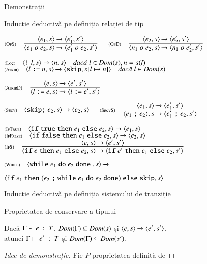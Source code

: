 \documentclass[xcolor=pdftex,romanian,colorlinks,handout]{beamer}
\begin{document}
\begin{section}{Demonstrații}
\begin{subsection}{Inducție deductivă pe definiția relației de tip}
\begin{frame}
\vfill { $\reg[OpS]{\Ss{\c{e_1 \mathrel{o} e_2,\stare}}{\c{e_1' \mathrel{o} e_2,\stare'}}}{\Ss{\c{e_1,\stare}}{\c{e_1',\stare'}}}{}$\hfill
$\reg[OpD]{\Ss{\c{n_1 \mathrel{o} e_2,\stare}}{\c{n_1 \mathrel{o} e_2',\stare'}}}{\Ss{\c{e_2,\stare}}{\c{e_2',\stare'}}}{}$}

\vfill $\reg[Loc]{\Ss{\c{\terminal{!} l,\stare}}{\c{n, \stare}}}{}{l\in\Dom(\stare), n = \stare(l)}$
$\reg[Atrib]{\Ss{\c{l \terminal{:=} n,\stare}}{\c{\terminal{skip},\stare[l \mapsto n]}}}{}{l\in\Dom(\stare)}$

\vfill$\reg[AtribD]{\Ss{\c{l \terminal{:=} e ,\stare}}{\c{l \terminal{:=} e' ,\stare'}}}{\Ss{\c{e,\stare}}{\c{e',\stare'}}}{}$

$\reg[Secv]{\Ss{\c{\terminal{skip} \terminal{;} e_2,\stare}}{\c{e_2,\stare}}}{}{}$
$\reg[SecvS]{\Ss{\c{e_1 \terminal{;} e_2},\stare}{\c{e_1' \terminal{;} e_2,\stare'}}}{\Ss{\c{e_1,\stare}}{\c{e_1',\stare'}}}{}$


\vfill $\reg[IfTrue]{\Ss{\c{\Sif  {\terminal{true}} \Sthen e_1 \Selse e_2,\stare}}{\c{e_1,\stare}}}{}{}$ 
$\reg[IfFalse]{\Ss{\c{\Sif {\terminal{false}} \Sthen e_1 \Selse e_2,\stare}}{\c{e_2,\stare}}}{}{}$ 
$\reg[IfS]{
 \Ss{\c{\Sif {e} \Sthen e_1 \Selse e_2,\stare}}{\c{\Sif  {e'} \Sthen e_1 \Selse e_2,\stare'}}
}{
  \Ss{\c{e,\stare}}{\c{e',\stare'}}
}
{}$

\vfill $\reg[While]{\Ss{\c{\Swhile {e_1} \Sdo e_2 \Sdone{},\stare}}{}}{}
{}$

\hfill ${\langle{\ensuremath\mathrel{\text{\ttfamily if}}{e_1} \ensuremath\mathrel{\text{\ttfamily then}}(e_2\ensuremath\mathrel{\text{\ttfamily ;}} {\ensuremath\mathrel{\text{\ttfamily while}}{e_1} \ensuremath\mathrel{\text{\ttfamily do}}e_2 \ensuremath\mathrel{\text{\ttfamily done}}}) \ensuremath\mathrel{\text{\ttfamily else}}{\ensuremath\mathrel{\text{\ttfamily skip}}},s}\rangle}$

\end{frame}

\end{subsection}

\begin{subsection}{Inducție deductivă pe definiția sistemului de tranziție}

\begin{frame}{Proprietatea de conservare a tipului}

\begin{theorem}
Dacă ${\displaystyle \Gamma\vdash \; e \; : \; T}$, $\mathop{\it Dom}(\Gamma) \subseteq \mathop{\it Dom}(s)$ și $\displaystyle{\ensuremath {{\langle{e,s}\rangle}} \xrightarrow{} {{\ensuremath \langle{e',s'}\rangle}}}$, \\atunci 
${\displaystyle \Gamma\vdash \; e' \; : \; T}$ și $\mathop{\it Dom}(\Gamma) \subseteq \mathop{\it Dom}(s')$.
\end{theorem}

\begin{proof}[Idee de demonstrație]
 Fie $P$ proprietatea definită de 


\end{proof}
\end{frame}
\end{subsection}
\end{section}
\end{document}

